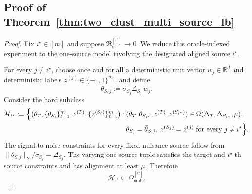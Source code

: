 \documentclass[10pt]{article}
\newcommand{\R}{\mathbb R}
\newcommand{\trg}{T}
\newcommand{\thetaT}{\theta_{\trg}}
\newcommand{\ztar}{z^{(\trg)}}
\newcommand{\DeltaT}{\Delta_{\trg}}
\newcommand{\src}{S}
\newcommand{\nSm}[1]{n_{\src_{#1}}}
\newcommand{\sigmaSm}[1]{\sigma_{\src_{#1}}}
\newcommand{\zsrcm}[1]{z^{(\src_{#1})}}
\newcommand{\thetamS}[1]{\theta_{\src_{#1}}}
\newcommand{\DeltaSm}[1]{\Delta_{\src_{#1}}}
\begin{document}
\subsection{Proof of Theorem~\ref{thm:two_clust_multi_source_lb}}
\label{app:proof-multisource-lb}
\begin{proof}
Fix $i^\star\in[m]$ and suppose
$\mathfrak R_{\mathrm{or}}^{[i^\star]}\to0$.  We reduce this oracle-indexed
experiment to the one-source model involving the designated aligned source
$i^\star$.

For every $j\neq i^\star$, choose once and for all a deterministic unit vector
$w_j\in\R^d$ and deterministic labels
$\bar z^{(j)}\in\{-1,1\}^{\nSm{j}}$, and define
\[
    \bar{\theta}_{S,j}:=\sigmaSm{j}\DeltaSm{j}\,w_j.
\]
Consider the hard subclass
\begin{align*}
    \mathcal H_{i^\star}
    :=
    \Bigl\{
    \bigl(\thetaT,\{\thetamS{\ell}\}_{\ell=1}^m,\ztar,\{\zsrcm{\ell}\}_{\ell=1}^m\bigr):
    &\,(\thetaT,\thetamS{i^\star},\ztar,\zsrcm{i^\star})
    \in \Omega(\DeltaT,\DeltaSm{i^\star},\mu),\\
    &\,\thetamS{j}=\bar{\theta}_{S,j},\;
    \zsrcm{j}=\bar z^{(j)}
    \text{ for every } j\neq i^\star
    \Bigr\}.
\end{align*}
The signal-to-noise constraints for every fixed nuisance source follow from
$\|\bar\theta_{S,j}\|_2/\sigmaSm{j}=\DeltaSm{j}$. The varying one-source
tuple satisfies the target and $i^\star$-th source constraints and has alignment at
least $\mu$. Therefore
\begin{equation}
\label{eq:hard-mult-subclass-inclusion}
    \mathcal H_{i^\star}\subseteq\Omega_{\mathrm{mult}}^{[i^\star]}.
\end{equation}


\end{proof}
\end{document}
